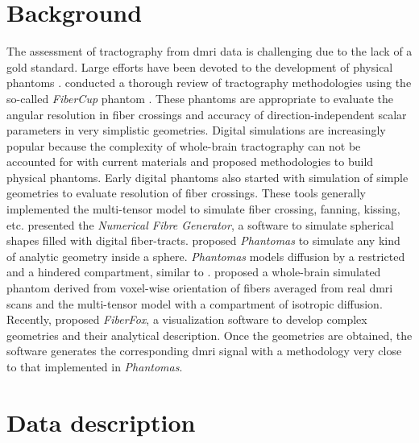 \documentclass[english]{frontiers/frontiersSCNS} %
\begin{document}
\section*{Background}
The assessment of tractography from \gls*{dmri} data is challenging due to
  the lack of a gold standard.
Large efforts have been devoted to the development of physical phantoms
  \citep{lin_validation_2001,campbell_flowbased_2005,perrin_validation_2005,fieremans_simulation_2008,tournier_resolving_2008}.
\cite{cote_tractometer_2013} conducted a thorough review of tractography methodologies using the
  so-called \emph{FiberCup} phantom \citep{poupon_new_2008,fillard_quantitative_2011}.
These phantoms are appropriate to evaluate the angular resolution in fiber crossings and accuracy of
  direction-independent scalar parameters in very simplistic geometries.
Digital simulations are increasingly popular because the complexity of whole-brain tractography
  can not be accounted for with current materials and proposed methodologies to build physical phantoms.
Early digital phantoms also started with simulation of simple geometries
  \citep{basser_in_2000,goessl_fiber_2002,tournier_limitations_2002,leemans_mathematical_2005}
  to evaluate resolution of fiber crossings.
These tools generally implemented the multi-tensor model \citep{alexander_analysis_2001,tuch_high_2002}
  to simulate fiber crossing, fanning, kissing, etc.
\cite{close_software_2009} presented the \emph{Numerical Fibre Generator}, a software to simulate
  spherical shapes filled with digital fiber-tracts.
\cite{caruyer_Phantomas_2014} proposed \emph{Phantomas} to simulate any kind of analytic geometry
  inside a sphere.
\emph{Phantomas} models diffusion by a restricted and a hindered compartment, similar to
  \citep{assaf_composite_2005}.
\cite{wilkins_fiber_2014} proposed a whole-brain simulated phantom derived from voxel-wise orientation
  of fibers averaged from real \gls*{dmri} scans and the multi-tensor model with a compartment of
  isotropic diffusion.
Recently, \cite{neher_fiberfox_2014} proposed \emph{FiberFox}, a visualization software to develop
  complex geometries and their analytical description.
Once the geometries are obtained, the software generates the corresponding \gls*{dmri} signal with a
  methodology very close to that implemented in \emph{Phantomas}.


\section*{Data description}
\end{document}
